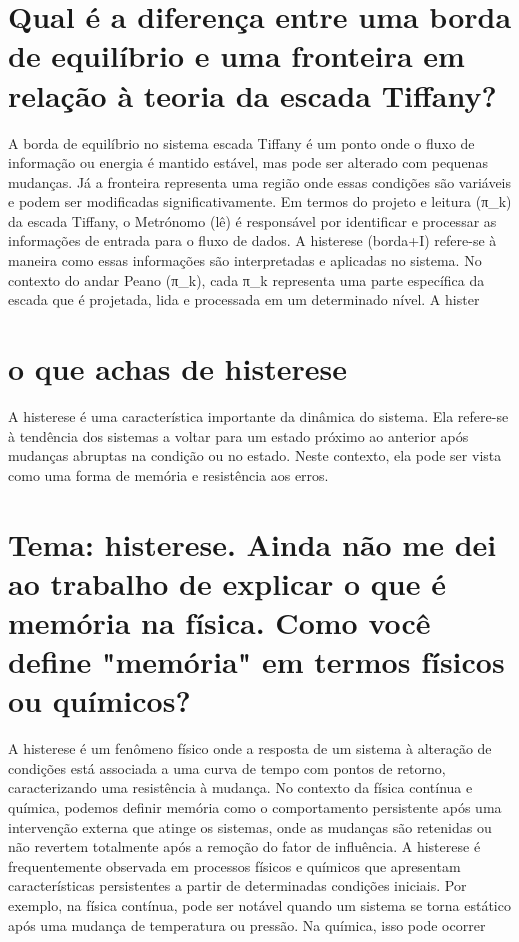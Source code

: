 \documentclass[11pt,a4paper]{article}
\begin{document}
\section{Qual é a diferença entre uma borda de equilíbrio e uma fronteira em relação à teoria da escada Tiffany?}
A borda de equilíbrio no sistema escada Tiffany é um ponto onde o fluxo de informação ou energia é mantido estável, mas pode ser alterado com pequenas mudanças. Já a fronteira representa uma região onde essas condições são variáveis e podem ser modificadas significativamente. Em termos do projeto e leitura (π\_k) da escada Tiffany, o Metrónomo (lê) é responsável por identificar e processar as informações de entrada para o fluxo de dados. A histerese (borda+I) refere-se à maneira como essas informações são interpretadas e aplicadas no sistema. No contexto do andar Peano (π\_k), cada π\_k representa uma parte específica da escada que é projetada, lida e processada em um determinado nível. A hister

\section{o que achas de histerese}
A histerese é uma característica importante da dinâmica do sistema. Ela refere-se à tendência dos sistemas a voltar para um estado próximo ao anterior após mudanças abruptas na condição ou no estado. Neste contexto, ela pode ser vista como uma forma de memória e resistência aos erros.

\section{Tema: histerese. Ainda não me dei ao trabalho de explicar o que é memória na física. Como você define "memória" em termos físicos ou químicos?}
A histerese é um fenômeno físico onde a resposta de um sistema à alteração de condições está associada a uma curva de tempo com pontos de retorno, caracterizando uma resistência à mudança. No contexto da física contínua e química, podemos definir memória como o comportamento persistente após uma intervenção externa que atinge os sistemas, onde as mudanças são retenidas ou não revertem totalmente após a remoção do fator de influência. A histerese é frequentemente observada em processos físicos e químicos que apresentam características persistentes a partir de determinadas condições iniciais. Por exemplo, na física contínua, pode ser notável quando um sistema se torna estático após uma mudança de temperatura ou pressão. Na química, isso pode ocorrer
\end{document}
